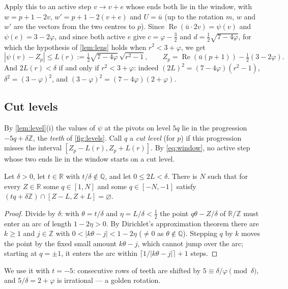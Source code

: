 \documentclass[11pt,a4paper]{article}
\newcommand{\R}{\mathbb{R}}
\newcommand{\Z}{\mathbb{Z}}
\newcommand{\Q}{\mathbb{Q}}
\newcommand{\re}{\operatorname{Re}}
\begin{document}
Apply this to an active step $v\to v+e$ whose ends both lie in the window, with $w=p+1-2v$,
$w'=p+1-2(v+e)$ and $U=\bar u$ (up to the rotation $m$, $w$ and $w'$ are the vectors from the two
centres to $p$). Since $\re(\bar u\cdot 2v)=\psi(v)$ and $\psi(e)=3-2\varphi$, and since both active
$e$ give $c=\varphi-\tfrac32$ and $d=\tfrac12\sqrt{7-4\varphi}$, for which the hypothesis of
\cref{lem:lens} holds when $r^2<3+\varphi$, we get
\begin{equation}\label{eq:window}
  |\psi(v)-Z_p|\le L(r) := \tfrac12\sqrt{7-4\varphi}\,\sqrt{r^2-1},
  \qquad Z_p=\re(\bar u(p+1))-\tfrac12(3-2\varphi).
\end{equation}
And $2L(r)<\delta$ if and only if $r^2<3+\varphi$: indeed $(2L)^2=(7-4\varphi)(r^2-1)$,
$\delta^2=(3-\varphi)^2$, and $(3-\varphi)^2=(7-4\varphi)(2+\varphi)$.

\subsection{Cut levels}

By \cref{lem:level}(i) the values of $\psi$ at the pivots on level $5q$ lie in the progression
$-5q+\delta\Z$, the \emph{teeth} of \cref{fig:levels}. Call $q$ a \emph{cut level} (for $p$) if this
progression misses the interval $[Z_p-L(r),Z_p+L(r)]$. By \eqref{eq:window}, no active step whose
two ends lie in the window starts on a cut level.

\begin{lemma}\label{lem:cut}
Let $\delta>0$, let $t\in\R$ with $t/\delta\notin\Q$, and let $0\le 2L<\delta$. There is $N$ such
that for every $Z\in\R$ some $q\in[1,N]$ and some $q\in[-N,-1]$ satisfy
$(tq+\delta\Z)\cap[Z-L,Z+L]=\varnothing$.
\end{lemma}

\begin{proof}
Divide by $\delta$: with $\theta=t/\delta$ and $\eta=L/\delta<\tfrac12$ the point
$q\theta-Z/\delta$ of $\R/\Z$ must enter an arc of length $1-2\eta>0$. By Dirichlet's approximation
theorem there are $k\ge1$ and $j\in\Z$ with $0<|k\theta-j|<1-2\eta$ ($\ne0$ as $\theta\notin\Q$).
Stepping $q$ by $k$ moves the point by the fixed small amount $k\theta-j$, which cannot jump over
the arc; starting at $q=\pm1$, it enters the arc within $\lceil 1/|k\theta-j|\rceil+1$ steps.
\end{proof}

We use it with $t=-5$: consecutive rows of teeth are shifted by $5\equiv\delta/\varphi\pmod\delta$,
and $5/\delta=2+\varphi$ is irrational --- a golden rotation.
\end{document}
